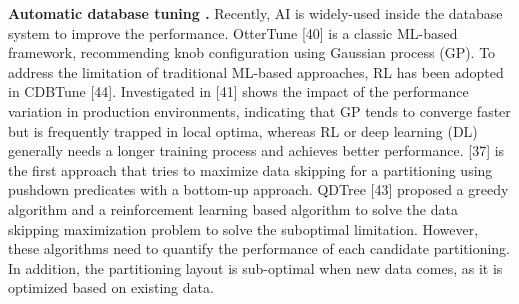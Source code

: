 




\noindent\textbf{Automatic database tuning .} 
Recently, AI is widely-used inside the database system to improve the performance. OtterTune [40] is a classic ML-based framework, recommending knob configuration using Gaussian process (GP). To address the limitation of traditional ML-based approaches, RL has been adopted in CDBTune [44]. Investigated in [41] shows the impact of the performance variation in production environments, indicating that GP tends to converge faster but is frequently trapped in local optima, whereas RL or deep learning (DL) generally needs a longer training process and achieves better performance.  [37] is the first approach that tries to maximize data skipping for a partitioning using pushdown predicates with a bottom-up approach. QDTree [43] proposed a greedy algorithm and a reinforcement learning based algorithm to solve the data skipping maximization problem to solve the suboptimal limitation. However, these algorithms need to quantify the performance of each candidate partitioning. In addition, the partitioning layout is sub-optimal when new data comes, as it is optimized based on existing data.